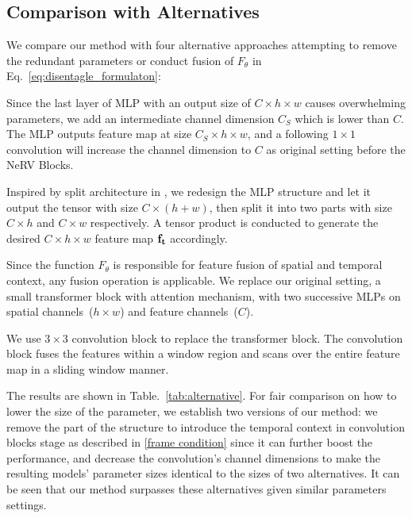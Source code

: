\documentclass[runningheads]{llncs}
\begin{document}
\subsection{Comparison with Alternatives}
\label{alternative exp}

We compare our method with four alternative approaches attempting to remove the redundant parameters or conduct fusion of $F_\theta$ in Eq.~\ref{eq:disentagle_formulaton}:

 Since the last layer of MLP with an output size of $C\times h\times w$ causes overwhelming parameters, we add an intermediate channel dimension $C_S$ which is lower than $C$. The MLP outputs feature map at size $C_S\times h\times w$, and a following $1\times1$ convolution will increase the channel dimension to $C$ as original setting before the NeRV Blocks.

 Inspired by split architecture in \cite{liang2022coordx}, we redesign the MLP structure and let it output the tensor with size $C\times(h + w)$, then split it into two parts with size $C\times h$ and $C\times w$ respectively. A tensor product is conducted to generate the desired $C\times h\times w$ feature map $\mathbf{f}_{\mathbf{t}}$ accordingly.

 Since the function $F_\theta$ is responsible for feature fusion of spatial and temporal context, any fusion operation is applicable. We replace our original setting, a small transformer block with attention mechanism, with two successive MLPs on spatial channels~($h\times w$) and feature channels~($C$).

 We use $3\times 3$ convolution block to replace the transformer block. The convolution block fuses the features within a window region and scans over the entire feature map in a sliding window manner.

The results are shown in Table.~\ref{tab:alternative}. For fair comparison on how to lower the size of the parameter, we establish two versions of our method: we remove the part of the structure to introduce the temporal context in convolution blocks stage as described in \ref{frame condition} since it can further boost the performance, and decrease the convolution's channel dimensions to make the resulting models' parameter sizes identical to the sizes of two alternatives. It can be seen that our method surpasses these alternatives given similar parameters settings.
\end{document}
